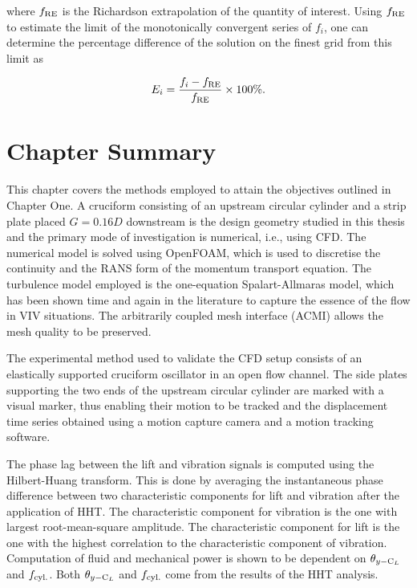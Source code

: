 \documentclass[oneside]{utmthesis}
\begin{document}
\noindent where $f_{\text{RE}}$ is the Richardson extrapolation of the quantity of interest. Using $f_{\text{RE}}$ to estimate the limit of the monotonically convergent series of $f_{i}$, one can determine the percentage difference of the solution on the finest grid from this limit as

\begin{equation}
  E_{i} = \frac{f_{i} - f_{\text{RE}}}{f_{\text{RE}}} \times 100\%.
  \label{eq:percentageDifference}
\end{equation}

\section{Chapter Summary} \label{sec:chapSumMethod}
This chapter covers the methods employed to attain the objectives outlined in Chapter One. A cruciform consisting of an upstream circular cylinder and a strip plate placed $G=0.16D$ downstream is the design geometry studied in this thesis and the primary mode of investigation is numerical, i.e., using CFD. The numerical model is solved using OpenFOAM, which is used to discretise the continuity and the RANS form of the momentum transport equation. The turbulence model employed is the one-equation Spalart-Allmaras model, which has been shown time and again in the literature to capture the essence of the flow in VIV situations. The arbitrarily coupled mesh interface (ACMI) allows the mesh quality to be preserved.

The experimental method used to validate the CFD setup consists of an elastically supported cruciform oscillator in an open flow channel. The side plates supporting the two ends of the upstream circular cylinder are marked with a visual marker, thus enabling their motion to be tracked and the displacement time series obtained using a motion capture camera and a motion tracking software.

The phase lag between the lift and vibration signals is computed using the Hilbert-Huang transform. This is done by averaging the instantaneous phase difference between two characteristic components for lift and vibration after the application of HHT. The characteristic component for vibration is the one with largest root-mean-square amplitude. The characteristic component for lift is the one with the highest correlation to the characteristic component of vibration. Computation of fluid and mechanical power is shown to be dependent on $\theta_{y-\text{C}_{L}}$ and $f_{\text{cyl.}}$. Both $\theta_{y-\text{C}_{L}}$ and $f_{\text{cyl.}}$ come from the results of the HHT analysis.
\end{document}
